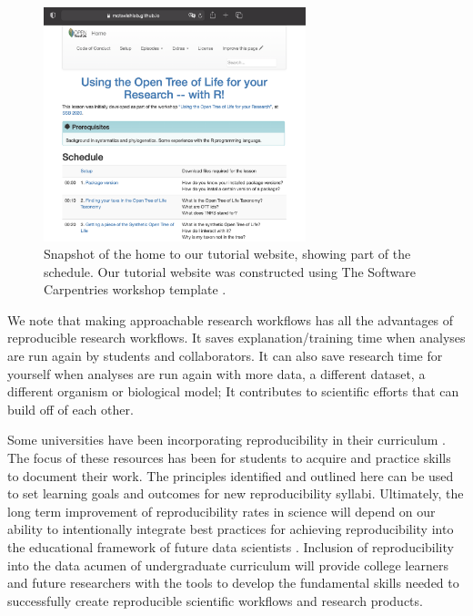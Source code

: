 \documentclass[12pt]{article}
\begin{document}
\begin{figure}
\begin{center}
\includegraphics[width=3in]{fig-schedule.png}
\end{center}
\caption{Snapshot of the home to our tutorial website, showing part of the schedule.
 Our tutorial website was constructed using The Software Carpentries workshop template \citep{swc-workshop-template}. \label{fig:schedule}}
\end{figure}

We note that making approachable research workflows has all the advantages of
reproducible research workflows.
It saves explanation/training time when analyses are run again by students and
collaborators.
It can also save research time for yourself when analyses are run again with more
data, a different dataset, a different organism or biological model;
It contributes to scientific efforts that can build off of each other.

Some universities have been incorporating reproducibility in their curriculum
\citep{uwlibraries2022, nigms2022}.
The focus of these resources has been for students to acquire and practice skills
to document their work.
The principles identified and outlined here can be used to set learning goals and
outcomes for new reproducibility syllabi.
Ultimately, the long term improvement of reproducibility rates in science will depend
on our ability to intentionally integrate best practices for achieving reproducibility
into the educational framework of future data scientists \citep{nasem2018data}.
Inclusion of reproducibility into the data acumen of undergraduate curriculum will
provide college learners and future researchers with the tools to develop
the fundamental skills needed to successfully create reproducible scientific workflows
and research products.
\end{document}

